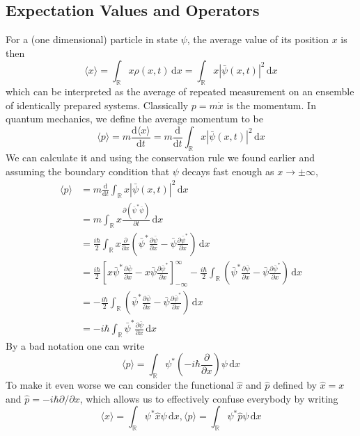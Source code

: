 \subsection{Expectation Values and Operators}
For a (one dimensional) particle in state $\psi$, the average value of its position $x$ is then
$$\langle x\rangle=\int_{\mathbb R}x\rho(x,t)\,\mathrm dx=\int_{\mathbb R}x|\bar\psi(x,t)|^2\,\mathrm dx$$
which can be interpreted as the average of repeated measurement on an ensemble of identically prepared systems.
Classically $p=m\dot{x}$ is the momentum.
In quantum mechanics, we define the average momentum to be
$$\langle p\rangle=m\frac{\mathrm d\langle x\rangle}{\mathrm dt}=m\frac{\mathrm d}{\mathrm dt}\int_{\mathbb R}x|\bar\psi(x,t)|^2\,\mathrm dx$$
We can calculate it and using the conservation rule we found earlier and assuming the boundary condition that $\psi$ decays fast enough as $x\to\pm\infty$,
\begin{align*}
    \langle p\rangle&=m\frac{\mathrm d}{\mathrm dt}\int_{\mathbb R}x|\bar\psi(x,t)|^2\,\mathrm dx\\
    &=m\int_{\mathbb R}x\frac{\partial(\bar\psi^*\bar\psi)}{\partial t}\,\mathrm dx\\
    &=\frac{i\hbar}{2}\int_{\mathbb R}x\frac{\partial}{\partial x}\left( \bar\psi^*\frac{\partial\bar\psi}{\partial x}-\bar\psi\frac{\partial\bar\psi^*}{\partial x} \right)\,\mathrm dx\\
    &=\frac{i\hbar}{2}\left[x\bar\psi^*\frac{\partial\bar\psi}{\partial x}-x\bar\psi\frac{\partial\bar\psi^*}{\partial x}\right]_{-\infty}^\infty-\frac{i\hbar}{2}\int_{\mathbb R}\left( \bar\psi^*\frac{\partial\bar\psi}{\partial x}-\bar\psi\frac{\partial\bar\psi^*}{\partial x} \right)\,\mathrm dx\\
    &=-\frac{i\hbar}{2}\int_{\mathbb R}\left( \bar\psi^*\frac{\partial\bar\psi}{\partial x}-\bar\psi\frac{\partial\bar\psi^*}{\partial x} \right)\,\mathrm dx\\
    &=-i\hbar\int_{\mathbb R}\bar\psi^\ast\frac{\partial\bar\psi}{\partial x}\,\mathrm dx
\end{align*}
By a bad notation one can write
$$\langle p\rangle=\int_{\mathbb R}\psi^*\left( -i\hbar\frac{\partial}{\partial x} \right)\psi\,\mathrm dx$$
To make it even worse we can consider the functional $\hat{x}$ and $\hat{p}$ defined by $\hat{x}=x$ and $\hat{p}=-i\hbar\partial/\partial x$, which allows us to effectively confuse everybody by writing
$$\langle x\rangle=\int_{\mathbb R}\psi^*\hat{x}\psi\,\mathrm dx,\langle p\rangle=\int_{\mathbb R}\psi^*\hat{p}\psi\,\mathrm dx$$
